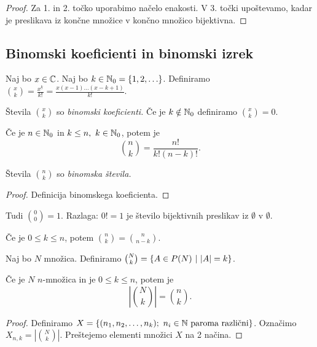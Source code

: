 \begin{proof}
    Za 1. in 2. točko uporabimo načelo enakosti. V 3. točki upoštevamo, kadar je preslikava iz končne množice v končno množico bijektivna.
\end{proof}

\newpage
\subsection{Binomski koeficienti in binomski izrek}
\begin{definicija}
    Naj bo $x \in \mathbb{C}$. Naj bo $k \in \mathbb{N}_0 = \left\{1, 2, \ldots\right\}$. Definiramo $\binom{x}{k} = \frac{x^{\underline{k}}}{k!} = \frac{x(x-1)\ldots (x-k+1)}{k!}$. 
    
    Števila $\binom{x}{k}$ so \emph{binomski koeficienti.}
    Če je $k \notin \mathbb{N}_0$ definiramo $\binom{x}{k} = 0$.
\end{definicija}

\begin{trditev}
    Če je $n \in \mathbb{N}_0$ in $k \leq n, \ k \in \mathbb{N}_0$, potem je 
    $$\binom{n}{k} = \frac{n!}{k!(n-k)!}.$$

    Števila $\binom{n}{k}$ so \emph{binomska števila.}
\end{trditev}

\begin{proof}
    Definicija binomskega koeficienta.
\end{proof}

\begin{opomba}
    Tudi $\binom{0}{0} = 1$. Razlaga: $0! = 1$ je število bijektivnih preslikav iz $\emptyset$ v $\emptyset$.
\end{opomba}

\begin{opomba}
    Če je $0 \leq k \leq n$, potem $\binom{n}{k} = \binom{n}{n-k}$.
\end{opomba}

\begin{definicija}
    Naj bo $N$ množica. Definiramo $\binom{N}{k} = \left\{A \in P(N) \ | \ |A| = k\right\}$.
\end{definicija}

\begin{trditev}
    Če je $N$ $n$-množica in je $0 \leq k \leq n$, potem je 
    $$\left| \binom{N}{k} \right| = \binom{n}{k}.$$
\end{trditev}

\begin{proof}
    Definiramo $X = \left\{(n_1, n_2, \ldots, n_k); \ n_i \in \mathbb{N} \text{ paroma različni}\right\}$. Označimo $X_{n,k} = \left| \binom{N}{k} \right|$. Preštejemo elementi množici $X$ na 2 načina.
\end{proof}

